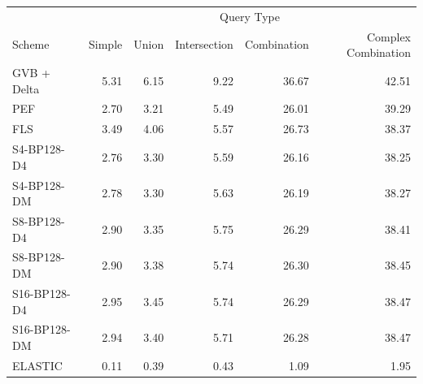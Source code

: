 \begin{tabular}{lrrrrr}
\toprule
 & \multicolumn{5}{c}{Query Type} \\
Scheme & Simple & Union & Intersection & Combination & Complex Combination \\
\midrule
GVB + Delta & 5.31 & 6.15 & 9.22 & 36.67 & 42.51 \\
PEF & 2.70 & 3.21 & 5.49 & 26.01 & 39.29 \\
FLS & 3.49 & 4.06 & 5.57 & 26.73 & 38.37 \\
S4-BP128-D4 & 2.76 & 3.30 & 5.59 & 26.16 & 38.25 \\
S4-BP128-DM & 2.78 & 3.30 & 5.63 & 26.19 & 38.27 \\
S8-BP128-D4 & 2.90 & 3.35 & 5.75 & 26.29 & 38.41 \\
S8-BP128-DM & 2.90 & 3.38 & 5.74 & 26.30 & 38.45 \\
S16-BP128-D4 & 2.95 & 3.45 & 5.74 & 26.29 & 38.47 \\
S16-BP128-DM & 2.94 & 3.40 & 5.71 & 26.28 & 38.47 \\
ELASTIC & 0.11 & 0.39 & 0.43 & 1.09 & 1.95 \\
\bottomrule
\end{tabular}
